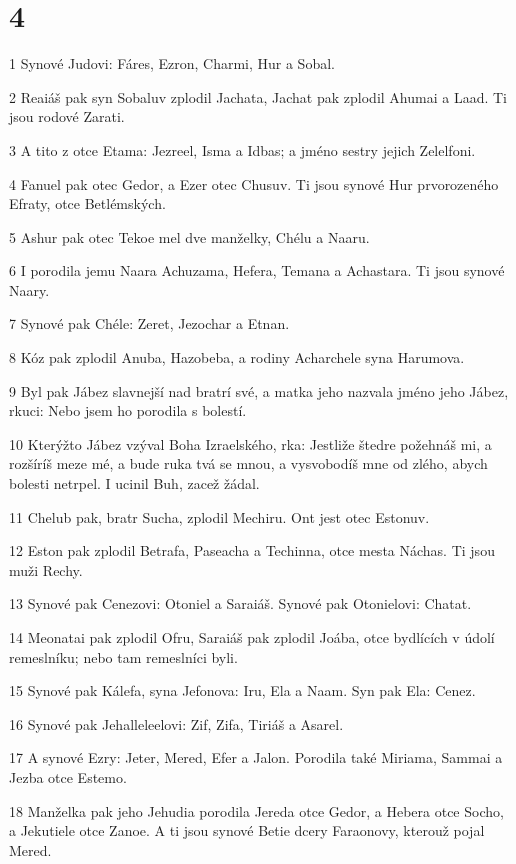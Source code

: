 \chapter{4}

\par 1 Synové Judovi: Fáres, Ezron, Charmi, Hur a Sobal.
\par 2 Reaiáš pak syn Sobaluv zplodil Jachata, Jachat pak zplodil Ahumai a Laad. Ti jsou rodové Zarati.
\par 3 A tito z otce Etama: Jezreel, Isma a Idbas; a jméno sestry jejich Zelelfoni.
\par 4 Fanuel pak otec Gedor, a Ezer otec Chusuv. Ti jsou synové Hur prvorozeného Efraty, otce Betlémských.
\par 5 Ashur pak otec Tekoe mel dve manželky, Chélu a Naaru.
\par 6 I porodila jemu Naara Achuzama, Hefera, Temana a Achastara. Ti jsou synové Naary.
\par 7 Synové pak Chéle: Zeret, Jezochar a Etnan.
\par 8 Kóz pak zplodil Anuba, Hazobeba, a rodiny Acharchele syna Harumova.
\par 9 Byl pak Jábez slavnejší nad bratrí své, a matka jeho nazvala jméno jeho Jábez, rkuci: Nebo jsem ho porodila s bolestí.
\par 10 Kterýžto Jábez vzýval Boha Izraelského, rka: Jestliže štedre požehnáš mi, a rozšíríš meze mé, a bude ruka tvá se mnou, a vysvobodíš mne od zlého, abych bolesti netrpel. I ucinil Buh, zacež žádal.
\par 11 Chelub pak, bratr Sucha, zplodil Mechiru. Ont jest otec Estonuv.
\par 12 Eston pak zplodil Betrafa, Paseacha a Techinna, otce mesta Náchas. Ti jsou muži Rechy.
\par 13 Synové pak Cenezovi: Otoniel a Saraiáš. Synové pak Otonielovi: Chatat.
\par 14 Meonatai pak zplodil Ofru, Saraiáš pak zplodil Joába, otce bydlících v údolí remeslníku; nebo tam remeslníci byli.
\par 15 Synové pak Kálefa, syna Jefonova: Iru, Ela a Naam. Syn pak Ela: Cenez.
\par 16 Synové pak Jehalleleelovi: Zif, Zifa, Tiriáš a Asarel.
\par 17 A synové Ezry: Jeter, Mered, Efer a Jalon. Porodila také Miriama, Sammai a Jezba otce Estemo.
\par 18 Manželka pak jeho Jehudia porodila Jereda otce Gedor, a Hebera otce Socho, a Jekutiele otce Zanoe. A ti jsou synové Betie dcery Faraonovy, kterouž pojal Mered.
